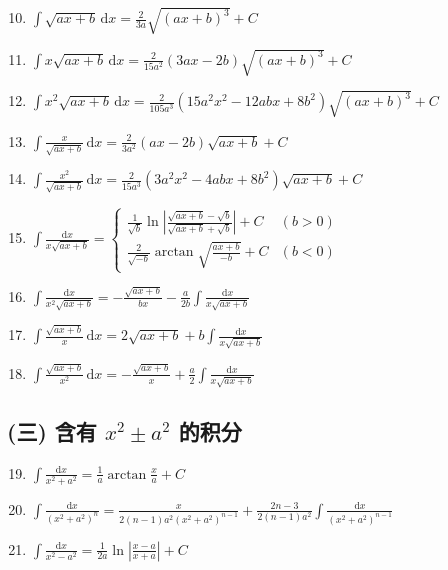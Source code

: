 \begin{enumerate}
    \setcounter{enumi}{9}
    \item $\displaystyle \int \sqrt{ax + b} \, \mathrm{d}x = \frac{2}{3a} \sqrt{(ax + b)^3} + C$
    \item $\displaystyle \int x \sqrt{ax + b} \, \mathrm{d}x = \frac{2}{15a^2} (3ax - 2b) \sqrt{(ax + b)^3} + C$
    \item $\displaystyle \int x^2 \sqrt{ax + b} \, \mathrm{d}x = \frac{2}{105a^3} (15a^2 x^2 - 12abx + 8b^2) \sqrt{(ax + b)^3} + C$
    \item $\displaystyle \int \frac{x}{\sqrt{ax + b}} \, \mathrm{d}x = \frac{2}{3a^2} (ax - 2b) \sqrt{ax + b} + C$
    \item $\displaystyle \int \frac{x^2}{\sqrt{ax + b}} \, \mathrm{d}x = \frac{2}{15a^3} (3a^2 x^2 - 4abx + 8b^2) \sqrt{ax + b} + C$
    \item $\displaystyle \int \frac{\mathrm{d}x}{x \sqrt{ax + b}} = 
    \begin{cases}
        \displaystyle \frac{1}{\sqrt{b}} \ln \left| \frac{\sqrt{ax + b} - \sqrt{b}}{\sqrt{ax + b} + \sqrt{b}} \right| + C & (b > 0) \\
        \displaystyle \frac{2}{\sqrt{-b}} \arctan \sqrt{\frac{ax + b}{-b}} + C & (b < 0)
    \end{cases}$
    \item $\displaystyle \int \frac{\mathrm{d}x}{x^2 \sqrt{ax + b}} = -\frac{\sqrt{ax + b}}{bx} - \frac{a}{2b} \int \frac{\mathrm{d}x}{x \sqrt{ax + b}}$
    \item $\displaystyle \int \frac{\sqrt{ax + b}}{x} \, \mathrm{d}x = 2\sqrt{ax + b} + b \int \frac{\mathrm{d}x}{x \sqrt{ax + b}}$
    \item $\displaystyle \int \frac{\sqrt{ax + b}}{x^2} \, \mathrm{d}x = -\frac{\sqrt{ax + b}}{x} + \frac{a}{2} \int \frac{\mathrm{d}x}{x \sqrt{ax + b}}$
\end{enumerate}

\subsection*{(三) 含有 $x^2 \pm a^2$ 的积分}

\begin{enumerate}
    \setcounter{enumi}{18}
    \item $\displaystyle \int \frac{\mathrm{d}x}{x^2 + a^2} = \frac{1}{a} \arctan \frac{x}{a} + C$
    \item $\displaystyle \int \frac{\mathrm{d}x}{(x^2 + a^2)^n} = \frac{x}{2(n - 1)a^2 (x^2 + a^2)^{n - 1}} + \frac{2n - 3}{2(n - 1)a^2} \int \frac{\mathrm{d}x}{(x^2 + a^2)^{n - 1}}$
    \item $\displaystyle \int \frac{\mathrm{d}x}{x^2 - a^2} = \frac{1}{2a} \ln \left| \frac{x - a}{x + a} \right| + C$
\end{enumerate}

